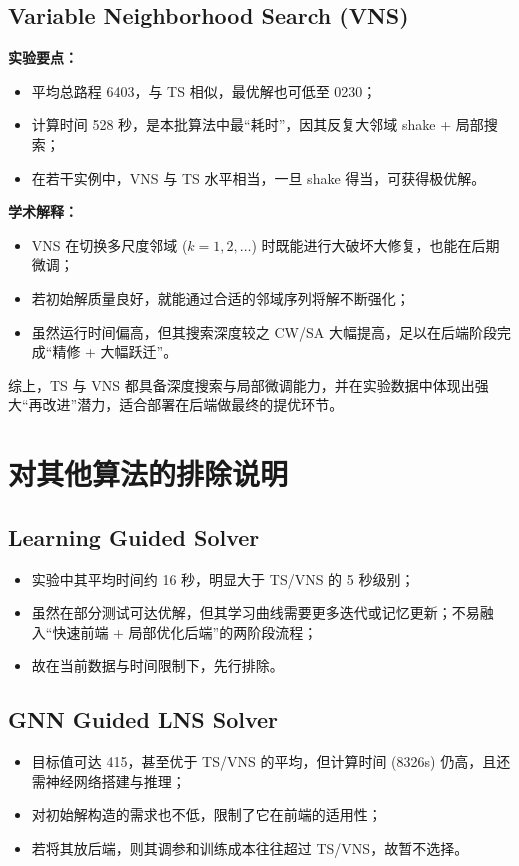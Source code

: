\documentclass[12pt,a4paper,twoside]{ctexbook}
\begin{document}
\subsection{Variable Neighborhood Search (VNS)}
\textbf{实验要点：}
\begin{itemize}
    \item 平均总路程 6403，与 TS 相似，最优解也可低至 0230；
    \item 计算时间 528 秒，是本批算法中最“耗时”，因其反复大邻域 shake + 局部搜索；
    \item 在若干实例中，VNS 与 TS 水平相当，一旦 shake 得当，可获得极优解。
\end{itemize}

\textbf{学术解释：}
\begin{itemize}
    \item VNS 在切换多尺度邻域 ($k=1,2,\dots$) 时既能进行大破坏大修复，也能在后期微调；
    \item 若初始解质量良好，就能通过合适的邻域序列将解不断强化；
    \item 虽然运行时间偏高，但其搜索深度较之 CW/SA 大幅提高，足以在后端阶段完成“精修 + 大幅跃迁”。
\end{itemize}

综上，TS 与 VNS 都具备深度搜索与局部微调能力，并在实验数据中体现出强大“再改进”潜力，适合部署在后端做最终的提优环节。

\section{对其他算法的排除说明}

\subsection{Learning Guided Solver}
\begin{itemize}
    \item 实验中其平均时间约 16 秒，明显大于 TS/VNS 的 5 秒级别；
    \item 虽然在部分测试可达优解，但其学习曲线需要更多迭代或记忆更新；不易融入“快速前端 + 局部优化后端”的两阶段流程；
    \item 故在当前数据与时间限制下，先行排除。
\end{itemize}

\subsection{GNN Guided LNS Solver}
\begin{itemize}
    \item 目标值可达 415，甚至优于 TS/VNS 的平均，但计算时间 (8326s) 仍高，且还需神经网络搭建与推理；
    \item 对初始解构造的需求也不低，限制了它在前端的适用性；
    \item 若将其放后端，则其调参和训练成本往往超过 TS/VNS，故暂不选择。
\end{itemize}
\end{document}
